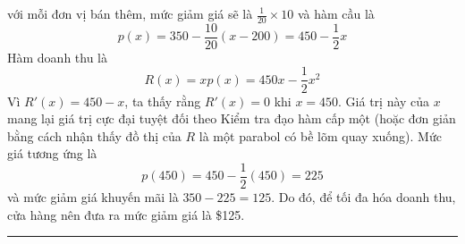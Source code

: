 \documentclass[10pt]{article}
\begin{document}
\noindent
\hspace*{155pt}%
\begin{minipage}{380pt}
    \fontsize{9.5}{13.5}\selectfont
    với mỗi đơn vị bán thêm, mức giảm giá sẽ là $\frac{1}{20} \times 10$ và hàm cầu là
    \[
    p(x) = 350 - \frac{10}{20}(x - 200) = 450 - \frac{1}{2}x
    \]
    Hàm doanh thu là
    \[
    R(x) = xp(x) = 450x - \frac{1}{2}x^2
    \]
    Vì $R'(x) = 450 - x$, ta thấy rằng $R'(x) = 0$ khi $x = 450$. Giá trị này của $x$ mang lại giá trị cực đại tuyệt đối theo Kiểm tra đạo hàm cấp một (hoặc đơn giản bằng cách nhận thấy đồ thị của $R$ là một parabol có bề lõm quay xuống). Mức giá tương ứng là
    \[
    p(450) = 450 - \frac{1}{2}(450) = 225
    \]
    và mức giảm giá khuyến mãi là $350 - 225 = 125$. Do đó, để tối đa hóa doanh thu, cửa hàng nên đưa ra mức giảm giá là \$125.\hfill{\color{stewartcyan}\rule{1.1ex}{1.1ex}}
\end{minipage}

\vspace{20pt}

\noindent
{}
\end{document}
